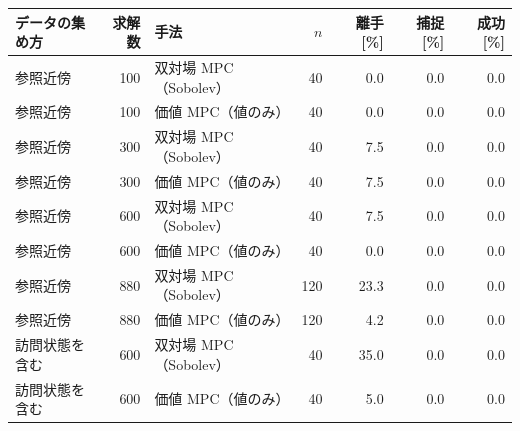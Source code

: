\begin{tabular}{lrlrrrr}
\toprule
データの集め方 & 求解数 & 手法 & $n$ & 離手 [\%] & 捕捉 [\%] & 成功 [\%] \\
\midrule
参照近傍 & 100 & 双対場 MPC（Sobolev） & 40 & 0.0 & 0.0 & 0.0 \\
参照近傍 & 100 & 価値 MPC（値のみ） & 40 & 0.0 & 0.0 & 0.0 \\
参照近傍 & 300 & 双対場 MPC（Sobolev） & 40 & 7.5 & 0.0 & 0.0 \\
参照近傍 & 300 & 価値 MPC（値のみ） & 40 & 7.5 & 0.0 & 0.0 \\
参照近傍 & 600 & 双対場 MPC（Sobolev） & 40 & 7.5 & 0.0 & 0.0 \\
参照近傍 & 600 & 価値 MPC（値のみ） & 40 & 0.0 & 0.0 & 0.0 \\
参照近傍 & 880 & 双対場 MPC（Sobolev） & 120 & 23.3 & 0.0 & 0.0 \\
参照近傍 & 880 & 価値 MPC（値のみ） & 120 & 4.2 & 0.0 & 0.0 \\
訪問状態を含む & 600 & 双対場 MPC（Sobolev） & 40 & 35.0 & 0.0 & 0.0 \\
訪問状態を含む & 600 & 価値 MPC（値のみ） & 40 & 5.0 & 0.0 & 0.0 \\
\bottomrule
\end{tabular}
